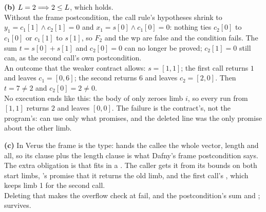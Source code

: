 \documentclass[11pt]{article}
\begin{document}
\begin{answer}
\textbf{(b)} $L = 2 \Longrightarrow 2 \leq L$, which holds. \\
Without the frame postcondition, the call rule's hypotheses shrink to
$y_1 = c_1[1] \wedge c_2[1] = 0$ and $x_1 = s[0] \wedge c_1[0] = 0$: nothing
ties $c_2[0]$ to $c_1[0]$ or $c_1[1]$ to $s[1]$, so $F_2$ and the wp are false
and the condition fails. The sum $t = s[0] + s[1]$ and $c_2[0] = 0$ can no
longer be proved; $c_2[1] = 0$ still can, as the second call's own
postcondition. \\
An outcome that the weaker contract allows: $s = [1, 1]$; the first call
returns $1$ and leaves $c_1 = [0, 6]$; the second returns $6$ and leaves
$c_2 = [2, 0]$. Then $t = 7 \neq 2$ and $c_2[0] = 2 \neq 0$. \\
No execution ends like this: the body of  only zeroes limb $i$, so
every run from $[1, 1]$ returns $2$ and leaves $[0, 0]$. The failure is the
contract's, not the program's:  can use only what 
promises, and the deleted line was the only promise about the other limb.

\textbf{(c)} In Verus the frame is the type:  hands the
callee the whole vector, length and all, so its  clause plus the
length clause is what Dafny's frame postcondition says. \\
The extra obligation is that  fits in a . The caller gets
it from its  bounds on both start limbs, 's promise
that it returns the old limb, and the first call's , which keeps
limb 1 for the second call. \\
Deleting that  makes the overflow check at  fail, and
the postcondition's sum and ; 
survives.
\end{answer}

\end{document}

